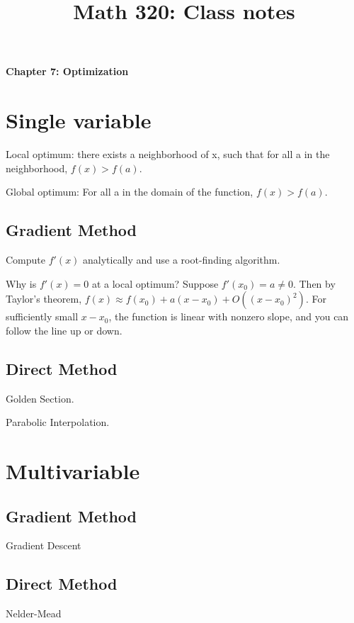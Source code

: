 \documentclass[12pt]{amsart}
\theoremstyle{definition}
\begin{document}
\title{Math 320: Class notes}
\maketitle


{\bf Chapter 7: Optimization}

\section{Single variable}

Local optimum: there exists a neighborhood of x, such that for all a in
the neighborhood, $f(x) > f(a)$.

Global optimum: For all a in the domain of the function, $f(x) > f(a)$.

\subsection{Gradient Method}

Compute $f'(x)$ analytically and use a root-finding algorithm.

Why is $f'(x) = 0$ at a local optimum?
Suppose $f'(x_0) = a \neq 0$. Then by Taylor's theorem, $f(x) \approx f(x_0) + a(x - x_0) + O((x-x_0)^2)$.
For sufficiently small $x - x_0$, the function is linear with nonzero slope, and you can
follow the line up or down.

\subsection{Direct Method}
Golden Section.

Parabolic Interpolation.

\section{Multivariable}

\subsection{Gradient Method}

Gradient Descent

\subsection{Direct Method}
Nelder-Mead
\end{document}
